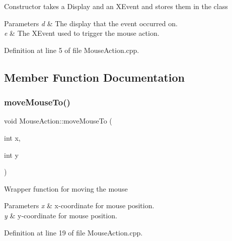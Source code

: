 Constructor takes a Display and an X\+Event and stores them in the class


\begin{DoxyParams}{Parameters}
{\em d} & The display that the event occurred on. \\
\hline
{\em e} & The X\+Event used to trigger the mouse action. \\
\hline
\end{DoxyParams}


Definition at line 5 of file Mouse\+Action.\+cpp.



\subsection{Member Function Documentation}
\mbox{\label{class_ubuntu_controller_1_1_mouse_action_a7a14cab01ad2ccdb1b135d4bae939fe2}} 
\subsubsection{\texorpdfstring{move\+Mouse\+To()}{moveMouseTo()}}
{\footnotesize\ttfamily void Mouse\+Action\+::move\+Mouse\+To (\begin{DoxyParamCaption}\item[{int}]{x,  }\item[{int}]{y }\end{DoxyParamCaption})}

Wrapper function for moving the mouse


\begin{DoxyParams}{Parameters}
{\em x} & x-\/coordinate for mouse position. \\
\hline
{\em y} & y-\/coordinate for mouse position. \\
\hline
\end{DoxyParams}


Definition at line 19 of file Mouse\+Action.\+cpp.

